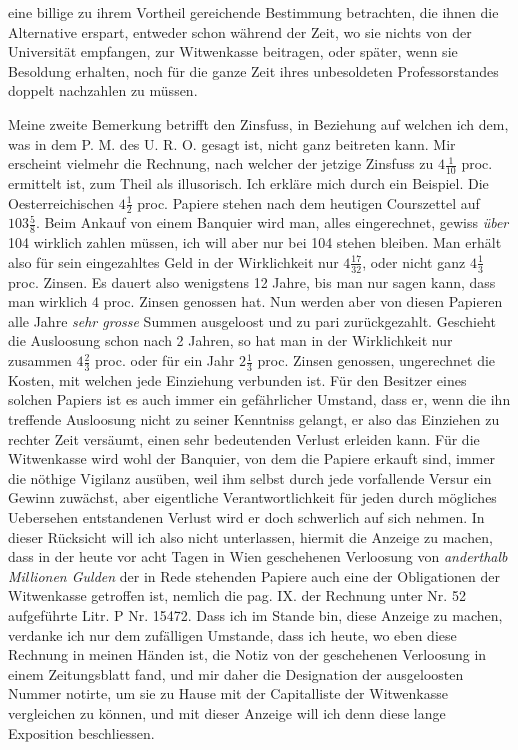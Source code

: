 eine billige zu ihrem Vortheil gereichende Bestimmung betrachten, die ihnen die Alternative erspart, entweder schon während der Zeit, wo sie nichts von der Universität empfangen, zur Witwenkasse beitragen, oder später, wenn sie Besoldung erhalten, noch für die ganze Zeit ihres unbesoldeten Professorstandes doppelt nachzahlen zu müssen.

Meine zweite Bemerkung betrifft den Zinsfuss, in Beziehung auf welchen ich dem, was in dem P. M. des U. R. O. gesagt ist, nicht ganz beitreten kann. Mir erscheint vielmehr die Rechnung, nach welcher der jetzige Zinsfuss zu \(4\tfrac1{10}\) proc. ermittelt ist, zum Theil als illusorisch. Ich erkläre mich durch ein Beispiel. Die Oesterreichischen \(4\tfrac12\) proc. Papiere stehen nach dem heutigen Courszettel auf \(103\tfrac58\). Beim Ankauf von einem Banquier wird man, alles eingerechnet, gewiss \textit{über} 104 wirklich zahlen müssen, ich will aber nur bei 104 stehen bleiben. Man erhält also für sein eingezahltes Geld in der Wirklichkeit nur \(4\tfrac{17}{32}\), oder nicht ganz \(4\tfrac13\) proc. Zinsen. Es dauert also wenigstens 12 Jahre, bis man nur sagen kann, dass man wirklich 4 proc. Zinsen genossen hat. Nun werden aber von diesen Papieren alle Jahre \textit{sehr grosse} Summen ausgeloost und zu pari zurückgezahlt. Geschieht die Ausloosung schon nach 2 Jahren, so hat man in der Wirklichkeit nur zusammen \(4\tfrac23\) proc. oder für ein Jahr \(2\tfrac13\) proc. Zinsen genossen, ungerechnet die Kosten, mit welchen jede Einziehung verbunden ist. Für den Besitzer eines solchen Papiers ist es auch immer ein gefährlicher Umstand, dass er, wenn die ihn treffende Ausloosung nicht zu seiner Kenntniss gelangt, er also das Einziehen zu rechter Zeit versäumt, einen sehr bedeutenden Verlust erleiden kann. Für die Witwenkasse wird wohl der Banquier, von dem die Papiere erkauft sind, immer die nöthige Vigilanz ausüben, weil ihm selbst durch jede vorfallende Versur ein Gewinn zuwächst, aber eigentliche Verantwortlichkeit für jeden durch mögliches Uebersehen entstandenen Verlust wird er doch schwerlich auf sich nehmen. In dieser Rücksicht will ich also nicht unterlassen, hiermit die Anzeige zu machen, dass in der heute vor acht Tagen in Wien geschehenen Verloosung von \textit{anderthalb Millionen Gulden} der in Rede stehenden Papiere auch eine der Obligationen der Witwenkasse getroffen ist, nemlich die pag. IX. der Rechnung unter Nr. 52 aufgeführte Litr. P Nr. 15472. Dass ich im Stande bin, diese Anzeige zu machen, verdanke ich nur dem zufälligen Umstande, dass ich heute, wo eben diese Rechnung in meinen Händen ist, die Notiz von der geschehenen Verloosung in einem Zeitungsblatt fand, und mir daher die Designation der ausgeloosten Nummer notirte, um sie zu Hause mit der Capitalliste der Witwenkasse vergleichen zu können, und mit dieser Anzeige will ich denn diese lange Exposition beschliessen.

